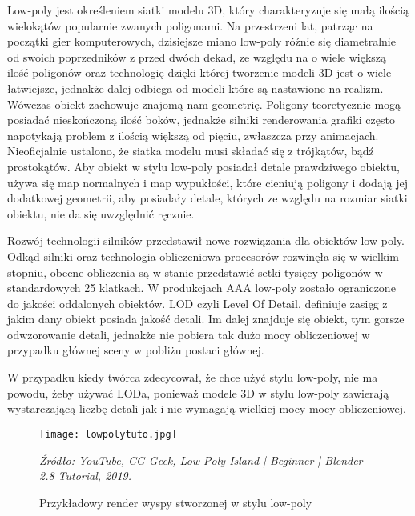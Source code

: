 \indent Low-poly jest określeniem siatki modelu 3D, który charakteryzuje się małą ilością wielokątów popularnie zwanych poligonami. Na przestrzeni lat, patrząc na początki gier komputerowych, dzisiejsze miano low-poly róźnie się diametralnie od swoich poprzedników z przed dwóch dekad, ze względu na o wiele większą ilość poligonów oraz technologię dzięki której tworzenie modeli 3D jest o wiele łatwiejsze, jednakże dalej odbiega od modeli które są nastawione na realizm. Wówczas obiekt zachowuje znajomą nam geometrię. Poligony teoretycznie mogą posiadać nieskończoną ilość boków, jednakże silniki renderowania grafiki często napotykają problem z ilością większą od pięciu, zwłaszcza przy animacjach. Nieoficjalnie ustalono, że siatka modelu musi składać się z trójkątów, bądź prostokątów. Aby obiekt w stylu low-poly posiadał detale prawdziwego obiektu, używa się map normalnych i map wypukłości, które cieniują poligony i dodają jej dodatkowej geometrii, aby posiadały detale, których ze względu na rozmiar siatki obiektu, nie da się uwzględnić ręcznie. 

\indent Rozwój technologii silników przedstawił nowe rozwiązania dla obiektów low-poly. Odkąd silniki oraz technologia obliczeniowa procesorów rozwinęła się w wielkim stopniu, obecne obliczenia są w stanie przedstawić setki tysięcy poligonów w standardowych 25 klatkach. W produkcjach AAA low-poly zostało ograniczone do jakości oddalonych obiektów. LOD czyli Level Of Detail, definiuje zasięg z jakim dany obiekt posiada jakość detali. Im dalej znajduje się obiekt, tym gorsze odwzorowanie detali, jednakże nie pobiera tak dużo mocy obliczeniowej w przypadku głównej sceny w pobliżu postaci głównej. \cite{1}

\indent W przypadku kiedy twórca zdecycował, że chce użyć stylu low-poly, nie ma powodu, żeby używać LODa, ponieważ modele 3D w stylu low-poly zawierają wystarczającą liczbę detali jak i nie wymagają wielkiej mocy mocy obliczeniowej.



\begin{figure}[hbt!]
\centering
  \texttt{[image: lowpolytuto.jpg]}
  \caption{Przykładowy render wyspy stworzonej w stylu low-poly}\label{rys_1}
  \begin{minipage}[t]{0.75\linewidth}
    \emph{Źródło: YouTube, CG Geek, Low Poly Island | Beginner | Blender 2.8 Tutorial, 2019.}
  \end{minipage}
\end{figure}

